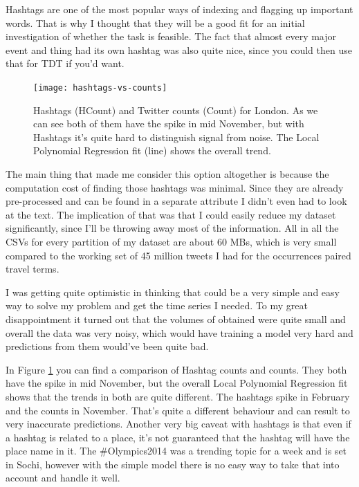 \documentclass[minf,twoside,singlespacing,parskip,frontabs,notimes,11pt]{infthesis}
\begin{document}
Hashtags are one of the most popular ways of indexing and flagging up important words. That is why I thought that they will be a good fit for an initial investigation of whether the task is feasible. The fact that almost every major event and thing had its own hashtag was also quite nice, since you could then use that for TDT if you'd want.

\begin{figure}[]
\begin{center}
\texttt{[image: hashtags-vs-counts]}
\end{center}
\caption{Hashtags (HCount) and Twitter counts (Count) for London. As we can see both of them have the spike in mid November, but with Hashtags it's quite hard to distinguish signal from noise. The Local Polynomial Regression fit (line) shows the overall trend.}
\label{hashtag-count}
\end{figure}


The main thing that made me consider this option altogether is because the computation cost of finding those hashtags was minimal. Since they are already pre-processed and can be found in a separate attribute I didn't even had to look at the text. The implication of that was that I could easily reduce my dataset significantly, since I'll be throwing away most of the information. All in all the CSVs for every partition of my dataset are about 60 MBs, which is very small compared to the working set of 45 million tweets I had for the occurrences paired travel terms. 


I was getting quite optimistic  in thinking that could be a very simple and easy way to solve my problem and get the time series I needed. To my great disappointment it turned out that the volumes of obtained were quite small and overall the data was very noisy, which would have training a model very hard and predictions from them would've been quite bad. 


In Figure \ref{hashtag-count} you can find a comparison of Hashtag counts and counts. They both have the spike in mid November, but the overall Local Polynomial Regression fit shows that the trends in both are quite different. The hashtags spike in February and the counts in November. That's quite a different behaviour and can result to very inaccurate predictions. Another very big caveat with hashtags is that even if a hashtag is related to a place, it's not guaranteed that the hashtag will have the place name in it. The \#Olympics2014 was a trending topic for a week and is set in Sochi, however with the simple model there is no easy way to take that into account and handle it well.
\end{document}
